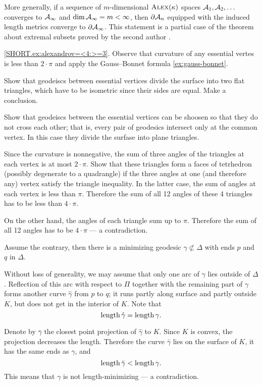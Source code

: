 More generally, if a sequence of $m$-dimensional $\textsc{Alex}(\kappa)$ spaces $\mathcal{A}_1,\mathcal{A}_2,\dots$ converges to $\mathcal{A}_\infty$ and $\operatorname{\rm dim}\nolimits \mathcal{A}_\infty=m<\infty$,
then $\partial \mathcal{A}_n$ equipped with the induced length metrics converge to  $\partial \mathcal{A}_\infty$.
This statement is a partial case of the theorem about extremal subsets proved by the second author \cite[1.2]{petrunin1997}.

\ref{SHORT.ex:alexandrov=<4:>=3}. Observe that curvature of any essential vertes is less than $2\cdot\pi$ and apply the Gauss--Bonnet formula \ref{ex:gauss-bonnet}.

 Show that geodeiscs between essential vertices divide the surface into two flat triangles, which have to be isometric since their sides are equal.
Make a conclusion.

Show that geodeiscs between the essential vertices can be shoosen so that they do not cross each other;
that is, every pair of geodesics intersect only at the common vertex.
In this case they divide the surfase into plane triangles.

Since the curvature is nonnegative, the sum of three angles of the triangles at each vertex is at most $2\cdot\pi$.
Show that these triangles form a faces of tetrhedron (possibly degenerate to a quadrangle)
if the three angles at one (and therefore any) vertex satisfy the triangle inequality.
In the latter case, the sum of angles at each vertex is less than $\pi$.
Therefore the sum of all 12 angles of these 4 triangles has to be less than $4\cdot \pi$.

On the other hand, the angles of each triangle sum up to $\pi$.
Therefore the sum of all 12 angles has to be $4\cdot \pi$ --- a contradiction.

 Assume the contrary,
then there is a minimizing geodesic $\gamma\not\subset\Delta$ with ends $p$ and $q$ in $\Delta$.

Without loss of generality, we may assume that only one arc of $\gamma$ lies outside of $\Delta$.
Reflection of this arc  with respect to $\Pi$ together with the remaining part of $\gamma$ forms another curve $\hat\gamma$ from $p$ to $q$;
it runs partly along surface
and partly outside $K$,
but does not get in the interior of $K$.
Note that
\[\mathop{\rm length}\nolimits\hat\gamma=\mathop{\rm length}\nolimits\gamma.\]

Denote by $\bar\gamma$ the closest point projection of $\hat\gamma$ to $K$.
Since $K$ is convex, the projection decreases the length.
Therefore
the curve $\bar\gamma$ lies on the surface of $K$,
it has the same ends as $\gamma$,
and
\[\mathop{\rm length}\nolimits\bar\gamma<\mathop{\rm length}\nolimits\gamma.\]
This means that $\gamma$ is not length-minimizing
--- a contradiction.

